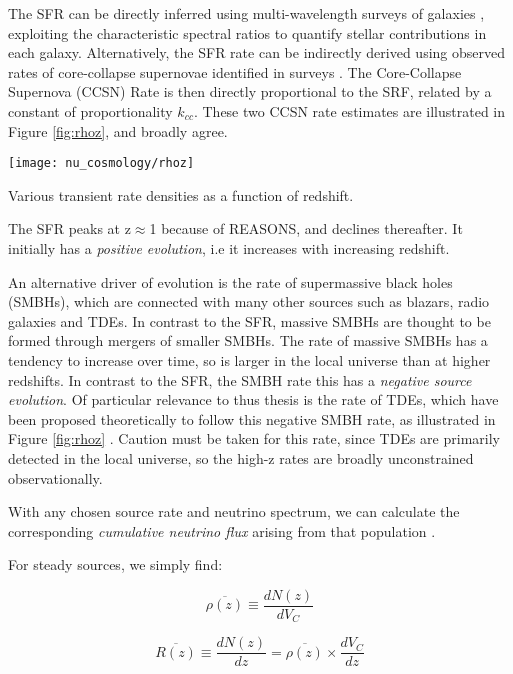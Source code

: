 The SFR can be directly inferred using multi-wavelength surveys of galaxies , exploiting the characteristic spectral ratios to quantify stellar contributions in each galaxy. Alternatively, the SFR rate can be indirectly derived using observed rates of core-collapse supernovae identified in surveys . The Core-Collapse Supernova (CCSN) Rate is then directly proportional to the SRF, related by a constant of proportionality $k_{cc}$. These two CCSN rate estimates are illustrated in Figure \ref{fig:rhoz}, and broadly agree.
\begin{marginfigure}
	\centering \texttt{[image: nu\_cosmology/rhoz]}
	\caption{Various transient rate densities as a function of redshift.}
	\label{fig:rhoz}
\end{marginfigure}
The SFR peaks at z$\approx$1 because of REASONS, and declines thereafter. It initially has a \emph{positive evolution}, i.e it increases with increasing redshift. 

An alternative driver of evolution is the rate of supermassive black holes (SMBHs), which are connected with many other sources such as blazars, radio galaxies and TDEs. In contrast to the SFR, massive SMBHs are thought to be formed through mergers of smaller SMBHs. The rate of massive SMBHs has a tendency to increase over time, so is larger in the local universe than at higher redshifts. In contrast to the SFR, the SMBH rate this has a \emph{negative source evolution}. Of particular relevance to thus thesis is the rate of TDEs, which have been proposed theoretically to follow this negative SMBH rate, as illustrated in Figure \ref{fig:rhoz} . Caution must be taken for this rate, since TDEs are primarily detected in the local universe, so the high-z rates are broadly unconstrained observationally.

With any chosen source rate and neutrino spectrum, we can calculate the corresponding \emph{cumulative neutrino flux} arising from that population \cite{Strotjohann2020Search}. 

For steady sources, we simply find:

\begin{equation}
\overline{\rho(z)} \equiv \frac{dN(z)}{dV_{C}}
\end{equation}

\begin{equation}
\overline{R(z)} \equiv \frac{dN(z)}{dz} = \overline{\rho(z)} \times \frac{dV_{C}}{dz}
\label{eq:steady_rate}
\end{equation}

